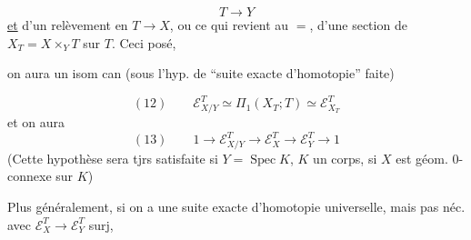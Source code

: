
\[
T\longrightarrow Y
\]
\uline{et} d'un relèvement en $T\longrightarrow X$, ou ce qui revient au $=$, d'une section de $X_T=X\times_YT$ sur $T$. Ceci posé,

\noindent
\begin{minipage}[t]{0.48\linewidth}
\vspace*{\baselineskip}
\end{minipage}\hfill
\begin{minipage}[t]{0.48\linewidth}
on aura un isom can (sous l'hyp. de ``suite exacte d'homotopie'' \deleted{\unsure{)}} faite)
\end{minipage}

\[
(12)\qquad \mathcal E_{X/Y}^T\simeq\Pi_1(X_T;T)\simeq\mathcal E_{X_T}^T
\]
et on aura
\[
(13)\qquad 1\longrightarrow\mathcal E_{X/Y}^T\longrightarrow\mathcal E_X^T\longrightarrow\mathcal E_Y^T\longrightarrow1
\]
(Cette hypothèse sera tjrs satisfaite si $Y=\operatorname{Spec}K$, $K$ un corps, si $X$ est géom. $0$-connexe sur $K$)

Plus généralement, si on a une suite exacte d'homotopie universelle, mais pas néc. avec $\mathcal E_X^T\longrightarrow\mathcal E_Y^T$ surj,

